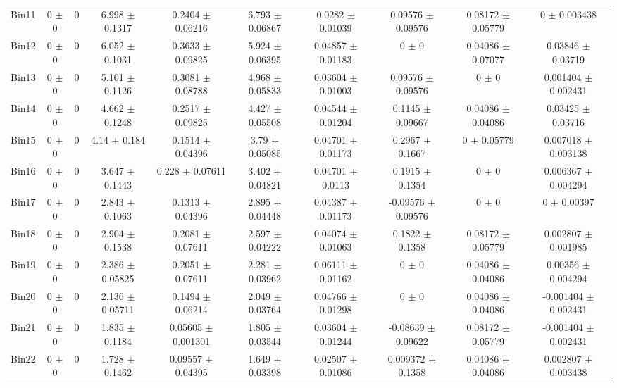 \begin{tabular}{@{\extracolsep{4pt}}lccccccccc@{}}
     Bin11 & 0 $\pm$ 0 & 0 & 6.998 $\pm$ 0.1317 & 0.2404 $\pm$ 0.06216 & 6.793 $\pm$ 0.06867 & 0.0282 $\pm$ 0.01039 & 0.09576 $\pm$ 0.09576 & 0.08172 $\pm$ 0.05779 & 0 $\pm$ 0.003438 \\ 
     Bin12 & 0 $\pm$ 0 & 0 & 6.052 $\pm$ 0.1031 & 0.3633 $\pm$ 0.09825 & 5.924 $\pm$ 0.06395 & 0.04857 $\pm$ 0.01183 & 0 $\pm$ 0 & 0.04086 $\pm$ 0.07077 & 0.03846 $\pm$ 0.03719 \\ 
     Bin13 & 0 $\pm$ 0 & 0 & 5.101 $\pm$ 0.1126 & 0.3081 $\pm$ 0.08788 & 4.968 $\pm$ 0.05833 & 0.03604 $\pm$ 0.01003 & 0.09576 $\pm$ 0.09576 & 0 $\pm$ 0 & 0.001404 $\pm$ 0.002431 \\ 
     Bin14 & 0 $\pm$ 0 & 0 & 4.662 $\pm$ 0.1248 & 0.2517 $\pm$ 0.09825 & 4.427 $\pm$ 0.05508 & 0.04544 $\pm$ 0.01204 & 0.1145 $\pm$ 0.09667 & 0.04086 $\pm$ 0.04086 & 0.03425 $\pm$ 0.03716 \\ 
     Bin15 & 0 $\pm$ 0 & 0 & 4.14 $\pm$ 0.184 & 0.1514 $\pm$ 0.04396 & 3.79 $\pm$ 0.05085 & 0.04701 $\pm$ 0.01173 & 0.2967 $\pm$ 0.1667 & 0 $\pm$ 0.05779 & 0.007018 $\pm$ 0.003138 \\ 
     Bin16 & 0 $\pm$ 0 & 0 & 3.647 $\pm$ 0.1443 & 0.228 $\pm$ 0.07611 & 3.402 $\pm$ 0.04821 & 0.04701 $\pm$ 0.0113 & 0.1915 $\pm$ 0.1354 & 0 $\pm$ 0 & 0.006367 $\pm$ 0.004294 \\ 
     Bin17 & 0 $\pm$ 0 & 0 & 2.843 $\pm$ 0.1063 & 0.1313 $\pm$ 0.04396 & 2.895 $\pm$ 0.04448 & 0.04387 $\pm$ 0.01173 & -0.09576 $\pm$ 0.09576 & 0 $\pm$ 0 & 0 $\pm$ 0.00397 \\ 
     Bin18 & 0 $\pm$ 0 & 0 & 2.904 $\pm$ 0.1538 & 0.2081 $\pm$ 0.07611 & 2.597 $\pm$ 0.04222 & 0.04074 $\pm$ 0.01063 & 0.1822 $\pm$ 0.1358 & 0.08172 $\pm$ 0.05779 & 0.002807 $\pm$ 0.001985 \\ 
     Bin19 & 0 $\pm$ 0 & 0 & 2.386 $\pm$ 0.05825 & 0.2051 $\pm$ 0.07611 & 2.281 $\pm$ 0.03962 & 0.06111 $\pm$ 0.01162 & 0 $\pm$ 0 & 0.04086 $\pm$ 0.04086 & 0.00356 $\pm$ 0.004294 \\ 
     Bin20 & 0 $\pm$ 0 & 0 & 2.136 $\pm$ 0.05711 & 0.1494 $\pm$ 0.06214 & 2.049 $\pm$ 0.03764 & 0.04766 $\pm$ 0.01298 & 0 $\pm$ 0 & 0.04086 $\pm$ 0.04086 & -0.001404 $\pm$ 0.002431 \\ 
     Bin21 & 0 $\pm$ 0 & 0 & 1.835 $\pm$ 0.1184 & 0.05605 $\pm$ 0.001301 & 1.805 $\pm$ 0.03544 & 0.03604 $\pm$ 0.01244 & -0.08639 $\pm$ 0.09622 & 0.08172 $\pm$ 0.05779 & -0.001404 $\pm$ 0.002431 \\ 
     Bin22 & 0 $\pm$ 0 & 0 & 1.728 $\pm$ 0.1462 & 0.09557 $\pm$ 0.04395 & 1.649 $\pm$ 0.03398 & 0.02507 $\pm$ 0.01086 & 0.009372 $\pm$ 0.1358 & 0.04086 $\pm$ 0.04086 & 0.002807 $\pm$ 0.003438 \\ 

\end{tabular}
